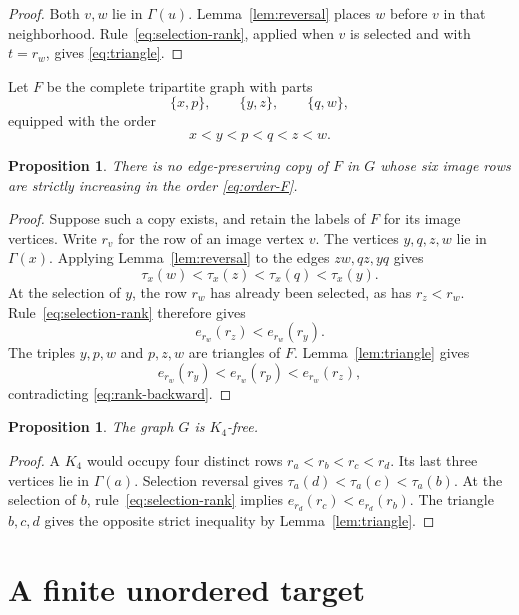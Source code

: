 \documentclass[10pt,letterpaper,leqno]{amsart}
\numberwithin{equation}{section}
\newtheorem{proposition}[theorem]{Proposition}
\theoremstyle{definition}
\theoremstyle{remark}
\newcommand{\Gam}{\Gamma}
\begin{document}
\begin{proof}
Both $v,w$ lie in $\Gam(u)$.
Lemma~\ref{lem:reversal} places $w$ before $v$ in that neighborhood.
Rule~\eqref{eq:selection-rank}, applied when $v$ is selected and with
$t=r_w$, gives \eqref{eq:triangle}.
\end{proof}

Let $F$ be the complete tripartite graph with parts
\[
 \{x,p\},\qquad \{y,z\},\qquad \{q,w\},
\]
equipped with the order
\begin{equation}\label{eq:order-F}
 x<y<p<q<z<w.
\end{equation}

\begin{proposition}\label{prop:ordered-obstruction}
There is no edge-preserving copy of $F$ in $G$ whose six image rows are
strictly increasing in the order \eqref{eq:order-F}.
\end{proposition}

\begin{proof}
Suppose such a copy exists, and retain the labels of $F$ for its image
vertices. Write $r_v$ for the row of an image vertex $v$.
The vertices $y,q,z,w$ lie in $\Gam(x)$.
Applying Lemma~\ref{lem:reversal} to the edges $zw,qz,yq$ gives
\[
 \tau_x(w)<\tau_x(z)<\tau_x(q)<\tau_x(y).
\]
At the selection of $y$, the row $r_w$ has already been selected, as has
$r_z<r_w$. Rule~\eqref{eq:selection-rank} therefore gives
\begin{equation}\label{eq:rank-backward}
 e_{r_w}(r_z)<e_{r_w}(r_y).
\end{equation}
The triples $y,p,w$ and $p,z,w$ are triangles of $F$.
Lemma~\ref{lem:triangle} gives
\[
 e_{r_w}(r_y)<e_{r_w}(r_p)<e_{r_w}(r_z),
\]
contradicting \eqref{eq:rank-backward}.
\end{proof}

\begin{proposition}\label{prop:host-K4}
The graph $G$ is $K_4$-free.
\end{proposition}

\begin{proof}
A $K_4$ would occupy four distinct rows $r_a<r_b<r_c<r_d$.
Its last three vertices lie in $\Gam(a)$.
Selection reversal gives
$\tau_a(d)<\tau_a(c)<\tau_a(b)$.
At the selection of $b$, rule~\eqref{eq:selection-rank} implies
$e_{r_d}(r_c)<e_{r_d}(r_b)$.
The triangle $b,c,d$ gives the opposite strict inequality by
Lemma~\ref{lem:triangle}.
\end{proof}

\section{A finite unordered target}
\end{document}
